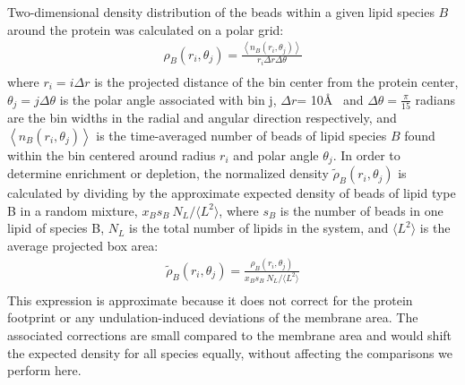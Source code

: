 \documentclass[final,3p,times,twocolumn]{elsarticle}
\begin{document}
  Two-dimensional density distribution of the beads within a given lipid species $B$ around the protein was calculated on a polar grid: 
  \begin{equation}
    \begin{aligned}
      \rho_{B}(r_i,\theta_j)= \frac{\left\langle n_{B}(r_i,\theta_j) \right\rangle}{r_i \Delta{r}\Delta{\theta}} \\        
    \end{aligned}
    \label{eq:R}
  \end{equation}
  where  $r_i = i \Delta{r}$ is the projected distance of the bin center from the protein center, $\theta_j = j \Delta{\theta}$ is the polar angle associated with bin j,  $\Delta{r}$= 10\AA~ and  $\Delta{\theta} = \frac{\pi}{15}$ radians are the bin widths in the radial and angular direction respectively, and $\left\langle n_{B}(r_i,\theta_j) \right\rangle$ is the time-averaged number of beads of lipid species $B$ found within the bin centered around radius $r_{i}$ and polar angle $\theta_{j}$.  In order to determine enrichment or depletion, the normalized density $ \tilde{\rho}_{B}(r_i,\theta_j)$ is calculated by dividing by the approximate expected density of beads of lipid type B in a random mixture, $x_{B}s_{B}~N_{L}/\langle L^{2}\rangle$, where $s_{B}$ is the number of beads in one lipid of species B, $N_{L}$ is the total number of lipids in the system, and $\langle L^{2}\rangle$ is the average projected box area: 
  \begin{equation}
    \begin{aligned}
  \tilde{\rho}_{B}(r_i,\theta_j)=\frac{ \rho_{B}(r_i,\theta_j)}{x_{B}s_{B}~N_{L}/\langle L^{2}\rangle} \\        
    \end{aligned}
    \label{eq:Rt}
  \end{equation}
  This expression is approximate because it does not correct for the protein footprint or any undulation-induced deviations of the membrane area.  The associated corrections are small compared to the membrane area and would shift the expected density for all species equally, without affecting the comparisons we perform here.   

 
\end{document}
